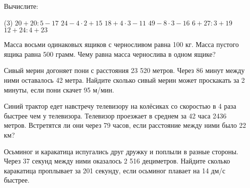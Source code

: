 \begin{homework}[number=4]
	\begin{listofex}
		\item Вычислите:
		\begin{tasks}(3)
			\task \( 20 + 20 : 5 - 17 \)
			\task \( 24 - 4 \cdot 2 + 15 \)
			\task \( 18 + 4 \cdot 3 - 11 \)
			\task \( 49 - 8 \cdot 3 - 16 \)
			\task \( 6 + 27 : 3 + 19 \)
			\task \( 12 + 24 : 4 + 23 \)
		\end{tasks}
		\item Масса восьми одинаковых ящиков с черносливом равна 100 кг. Масса пустого ящика равна 500 грамм. Чему равна масса чернослива в одном ящике?
		\item Сивый мерин догоняет пони с расстояния 23 520 метров. Через 86 минут между ними оставалось 42 метра. Найдите сколько сивый мерин может проскакать за 2 минуты, если пони скачет 
		95 м/мин.
		\item Синий трактор едет навстречу телевизору на колёсиках со скоростью в 4 раза быстрее чем у телевизора. Телевизор проезжает в среднем за 42 часа 2436 метров. Встретятся ли они через 79  часов, если расстояние между ними было 22 км?
		\item Осьминог и каракатица испугались друг дружку и поплыли в разные стороны. Через 37 секунд между ними оказалось 2 516 дециметров. Найдите сколько каракатица проплывает за 201 секунду, если осьминог плавает на 14 дм/с быстрее.
	\end{listofex}
\end{homework}
